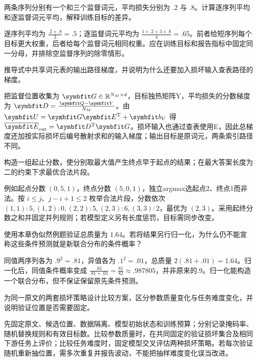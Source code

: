 \begin{exercises}
\begin{exercise} 两条序列分别有一个和三个监督词元，平均损失分别为 $.2$ 与 $.8$。计算逐序列平均和逐监督词元平均，解释训练目标的差异。

\begin{solution}
逐序列平均为 $\frac{.2+.8}{2}=.5$；逐监督词元平均为 $\frac{1\times.2+3\times.8}{4}=.65$。前者给短序列每个目标更大权重，后者给每个监督词元相同权重。应在训练目标和报告指标中固定同一分母，并排除空监督序列的除零情形。
\end{solution}
\end{exercise}

\begin{exercise} 推导式中共享词元表的输出路径梯度，并说明为什么还要加入损坏输入查表路径的梯度。

\begin{solution}
把监督位置收集为 $\mat{G}\in\Real^{N_M\times d}$，目标独热矩阵Y，平均损失的分数梯度为 $\mat{D}=\frac{\mat{Q}-\mat{Y}}{N_M}$。由 $\mat{U}=\mat{G}\mat{E}^{\mathrm{T}}+\vect{b}_V$ 得 $\overline{\mat{E}}_{\mathrm{out}}=\mat{D}^{\mathrm{T}}\mat{G}$。损坏输入也通过查表使用E，因此总梯度还加按实际损坏后编号散射求和的输入梯度；输出目标是原词元，两条索引路径不同。
\end{solution}
\end{exercise}

\begin{exercise}\optional 构造一组起止分数，使分别取最大值产生终点早于起点的结果；在最大答案长度为二的约束下求最优合法片段。

\begin{solution}
例如起点分数 $(0,5,1)$，终点分数 $(5,0,1)$，独立argmax选起点2、终点1而非法。按 $i\le j$、$j-i+1\le2$ 枚举合法片段，分数依次 $(1,1):5,(1,2):0,(2,2):5,(2,3):6,(3,3):2$，最优为 $(2,3)$。采用起终分数之和并固定并列规则；若模型定义另有长度惩罚，目标需同步改变。
\end{solution}
\end{exercise}

\begin{exercise}\optional 使用本章伪似然例题验证总质量为 $1.64$。若将结果另行归一化，为什么仍不能宣称这些条件预测就是新联合分布的条件概率？

\begin{solution}
同值两序列各为 $.9^2=.81$，异值各为 $.1^2=.01$，总质量 $2(.81+.01)=1.64$。归一化后，同值条件概率变成 $\frac{.81}{.81+.01}=\frac{81}{82}\approx.987805$，并非原来的.9。归一化能构造一个联合分布，但不保证保留原先条件预测。
\end{solution}
\end{exercise}

\begin{exercise} 为同一原文的两套损坏策略设计比较方案，区分参数质量变化与任务难度变化，并说明验证位置是否需要固定。

\begin{solution}
先固定原文、候选位置、数据隔离、模型初始状态和训练预算；分别记录掩码率、随机替换规则和有效目标数。比较参数质量时，在共同固定的验证损坏集合及相同下游任务上评价；比较任务难度时，固定模型交叉评估两种损坏策略。若每次验证随机重新抽位置，需多次重复并报告波动，不能把抽样难度变化误当改进。
\end{solution}
\end{exercise}

\end{exercises}
